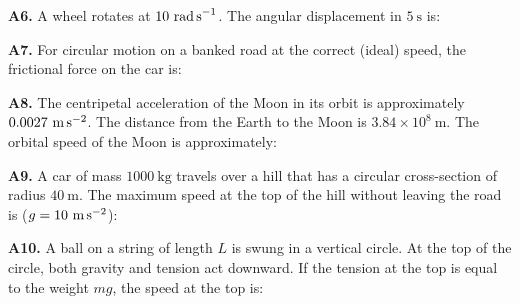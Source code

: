 \begin{exercisebox}[6]
\vspace{0.4cm}

\textbf{A6.} A wheel rotates at $10\ \text{rad\,s}^{-1}$.
The angular displacement in $5\ \text{s}$ is:


\vspace{0.4cm}

\textbf{A7.} For circular motion on a banked road
at the correct (ideal) speed, the frictional force
on the car is:


\vspace{0.4cm}

\textbf{A8.} The centripetal acceleration of the Moon
in its orbit is approximately $0.0027\ \text{m\,s}^{-2}$.
The distance from the Earth to the Moon is
$3.84 \times 10^8\ \text{m}$. The orbital speed of the
Moon is approximately:


\vspace{0.4cm}

\textbf{A9.} A car of mass $1000\ \text{kg}$ travels
over a hill that has a circular cross-section of
radius $40\ \text{m}$. The maximum speed at the top
of the hill without leaving the road is
($g = 10\ \text{m\,s}^{-2}$):


\vspace{0.4cm}

\textbf{A10.} A ball on a string of length $L$ is
swung in a vertical circle. At the top of the circle,
both gravity and tension act downward. If the tension
at the top is equal to the weight $mg$, the speed
at the top is:


\vspace{0.6cm}


\end{exercisebox}
